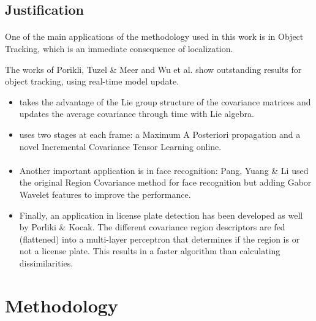 \documentclass{beamer}
\theoremstyle{definition}
\theoremstyle{remark}
\theoremstyle{example}
\newif\ifinsection
\newif\ifinsubsection
\let\oldsection\section
\renewcommand{\section}{
  \global\insectiontrue
  \global\insubsectionfalse
  \oldsection}
\let\oldsubsection\subsection
\renewcommand{\subsection}{
  \global\insubsectiontrue
  \oldsubsection}
\newcommand {\aframe}[1] {
  \begin{frame}
    \ifinsection\frametitle{\secname}\fi
    \ifinsubsection\framesubtitle{\subsecname}\fi
  #1
  \end{frame}
}
\begin{document}
\subsection{Justification}
\aframe{ One of the main applications of the methodology used in this work is in
  Object Tracking, which is an immediate consequence of localization.\pause

  The works of Porikli, Tuzel \& Meer\parencite{porikli2006covariance} and Wu et
  al.\parencite{wu2012real} show outstanding results for object tracking, using
  real-time model update.
  \begin{itemize}
    \item\parencite{porikli2006covariance} takes the advantage of the Lie group
          structure of the covariance matrices and updates the average
          covariance through time with Lie algebra.
    \item\parencite{wu2012real} uses two stages at each frame: a Maximum A
          Posteriori propagation and a novel Incremental Covariance Tensor
          Learning online.
\end{itemize}
}

\aframe{
  \begin{itemize}
    \item Another important application is in face recognition: Pang, Yuang \&
          Li\parencite{pang2008gabor} used the original Region Covariance method
          for face recognition but adding Gabor Wavelet features to improve the
          performance.\pause
    \item Finally, an application in license plate detection has been developed
          as well by Porliki \& Kocak\cite{porikli2006robust}. The different
          covariance region descriptors are fed (flattened) into a multi-layer
          perceptron that determines if the region is or not a license plate.
          This results in a faster algorithm than calculating dissimilarities.
    \end{itemize}
}

\section{Methodology}
\end{document}
